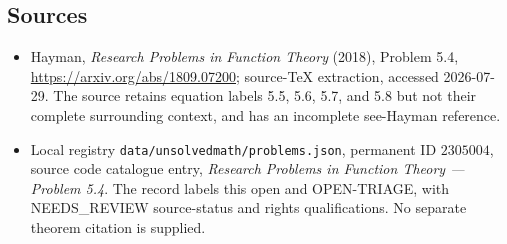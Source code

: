 \documentclass[11pt]{article}
\begin{document}
\subsection{Sources}
\begin{itemize}
\item Hayman, \emph{Research Problems in Function Theory} (2018), Problem 5.4, \url{https://arxiv.org/abs/1809.07200}; source-TeX extraction, accessed 2026-07-29. The source retains equation labels 5.5, 5.6, 5.7, and 5.8 but not their complete surrounding context, and has an incomplete see-Hayman reference.
\item Local registry \texttt{data/unsolvedmath/problems.json}, permanent ID $2305004$, source code catalogue entry, \emph{Research Problems in Function Theory --- Problem 5.4}. The record labels this open and OPEN-TRIAGE, with NEEDS\_REVIEW source-status and rights qualifications. No separate theorem citation is supplied.
\end{itemize}
\end{document}

